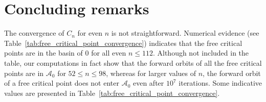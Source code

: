 \documentclass[12pt]{article}
\begin{document}
\section{Concluding remarks}\label{S5_Con-rem}
The convergence of $C_n$ for even $n$ is not straightforward. Numerical evidence (see Table~\ref{tab:free_critical_point_convergence}) indicates that the free critical points are in the basin of $0$ for all even $n \leq 112$. Although not included in the table, our computations in fact show that the forward orbits of all the free critical points are in $ \mathcal{A}_0$ for $52 \leq n  \leq 98$, whereas for larger values of $n$, the forward orbit of a free critical point does not enter $\mathcal{A}_0$ even after $10^{7}$  iterations. Some indicative values are presented in Table~\ref{tab:free_critical_point_convergence}.
\end{document}
